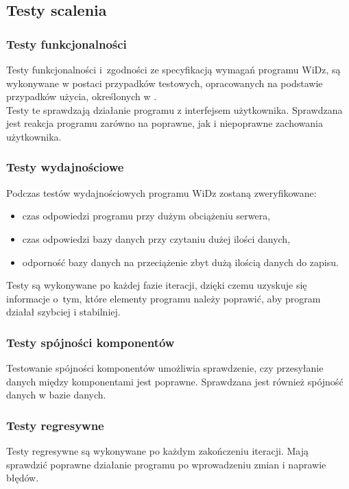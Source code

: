 \documentclass[12pt,leqno,twoside]{mwart}
\begin{document}
\subsection{Testy scalenia}
\subsubsection{Testy funkcjonalności}
\noindent Testy funkcjonalności i~zgodności ze specyfikacją wymagań programu WiDz, są wykonywane w postaci przypadków testowych, opracowanych na podstawie przypadków użycia, określonych w \cite{PU}. \\
\indent Testy te sprawdzają działanie programu z interfejsem użytkownika. Sprawdzana jest reakcja programu zarówno na poprawne, jak i niepoprawne zachowania użytkownika. \\
\subsubsection{Testy wydajnościowe}
\noindent Podczas testów wydajnościowych programu WiDz zostaną zweryfikowane:
\begin{itemize}
	\item czas odpowiedzi programu przy dużym obciążeniu serwera,
	\item czas odpowiedzi bazy danych przy czytaniu dużej ilości danych,
	\item odporność bazy danych na przeciążenie zbyt dużą ilością danych do zapisu.
\end{itemize}
\indent Testy są wykonywane po każdej fazie iteracji, dzięki czemu uzyskuje się informacje o~tym, które elementy programu należy poprawić, aby program działał szybciej i stabilniej. \\
\subsubsection{Testy spójności komponentów}
\noindent Testowanie spójności komponentów umożliwia sprawdzenie, czy przesyłanie danych między komponentami jest poprawne. Sprawdzana jest również spójność danych w bazie danych. \\
\subsubsection{Testy regresywne}
\noindent Testy regresywne są wykonywane po każdym zakończeniu iteracji. Mają sprawdzić poprawne działanie programu po wprowadzeniu zmian i naprawie błędów.\\
\end{document}
